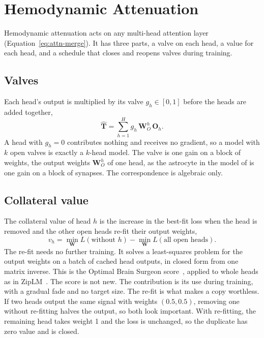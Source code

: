 \section{Hemodynamic Attenuation}
\label{sec:rule}

Hemodynamic attenuation acts on any multi-head attention layer (Equation~\eqref{eq:attn-merge}). It has three parts, a valve on each head, a value for each head, and a schedule that closes and reopens valves during training.

\subsection{Valves}

Each head's output is multiplied by its valve $g_h\in[0,1]$ before the heads are added together,
\begin{equation}
  \hat{\bm T} = \sum_{h=1}^{H} g_h\, \bm W_O^h\, \bm O_h .
  \label{eq:valve}
\end{equation}
A head with $g_h = 0$ contributes nothing and receives no gradient, so a model with $k$ open valves is exactly a $k$-head model. The valve is one gain on a block of weights, the output weights $\bm W_O^h$ of one head, as the astrocyte in the model of \citet{kozachkov2023} is one gain on a block of synapses. The correspondence is algebraic only.

\subsection{Collateral value}

The collateral value of head $h$ is the increase in the best-fit loss when the head is removed and the other open heads re-fit their output weights,
\begin{equation}
  v_h = \min_{\bm W} L(\text{without } h) - \min_{\bm W} L(\text{all open heads}).
  \label{eq:collateral}
\end{equation}
The re-fit needs no further training. It solves a least-squares problem for the output weights on a batch of cached head outputs, in closed form from one matrix inverse. This is the Optimal Brain Surgeon score~\citep{obs}, applied to whole heads as in ZipLM~\citep{ziplm}. The score is not new. The contribution is its use during training, with a gradual fade and no target size. The re-fit is what makes a copy worthless. If two heads output the same signal with weights $(0.5, 0.5)$, removing one without re-fitting halves the output, so both look important. With re-fitting, the remaining head takes weight 1 and the loss is unchanged, so the duplicate has zero value and is closed.

